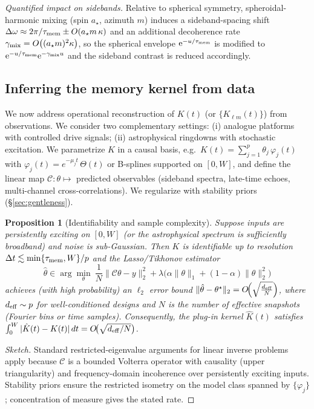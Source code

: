 \documentclass[aps,prd,preprint,onecolumn,superscriptaddress,nofootinbib,longbibliography,floatfix,11pt,showpacs,showkeys]{revtex4-2}
\theoremstyle{plain}
\newtheorem{proposition}[theorem]{Proposition}
\theoremstyle{definition}
\theoremstyle{remark}
\begin{document}
\noindent\emph{Quantified impact on sidebands.} Relative to spherical symmetry, spheroidal-harmonic mixing (spin $a_\star$, azimuth $m$) induces a sideband-spacing shift
\(\Delta\omega\approx 2\pi/\tau_{\rm mem} \pm O(a_\star m\,\kappa)\) and an additional decoherence rate
\(\gamma_{\rm mix}=O\big((a_\star m)^2\kappa\big)\), so the spherical envelope $\mathrm{e}^{-u/\tau_{\rm mem}}$ is modified to $\mathrm{e}^{-u/\tau_{\rm mem}}\mathrm{e}^{-\gamma_{\rm mix} u}$ and the sideband contrast is reduced accordingly.

\subsection{Inferring the memory kernel from data}
\label{sec:inference}
We now address operational reconstruction of $K(t)$ (or $\{K_{\ell m}(t)\}$) from observations. We consider two complementary
settings: (i) analogue platforms with controlled drive signals; (ii) astrophysical ringdowns with stochastic excitation.
We parametrize $K$ in a causal basis, e.g.\ $K(t)=\sum_{j=1}^{p}\theta_j\,\varphi_j(t)$ with $\varphi_j(t)=e^{-\mu_j t}\,\Theta(t)$
or B-splines supported on $[0,W]$, and define the linear map $\mathcal{C}:\theta\mapsto$ predicted observables (sideband spectra,
late-time echoes, multi-channel cross-correlations). We regularize with stability priors (\S\ref{sec:gentleness}).

\begin{proposition}[Identifiability and sample complexity]\label{prop:identifiability}
Suppose inputs are persistently exciting on $[0,W]$ (or the astrophysical spectrum is sufficiently broadband) and noise is sub-Gaussian.
Then $K$ is identifiable up to resolution $\Delta t\lesssim \min\{\tau_{\rm mem},W\}/p$ and the Lasso/Tikhonov estimator
\begin{equation}
\hat\theta \in \arg\min_{\theta}\ \frac{1}{N}\|\mathcal{C}\theta-y\|_2^2+\lambda\big(\alpha\|\theta\|_1+(1-\alpha)\|\theta\|_2^2\big)
\end{equation}
achieves (with high probability) an $\ell_2$ error bound $\|\hat\theta-\theta^\star\|_2 = O\!\Big(\sqrt{\tfrac{d_{\rm eff}}{N}}\Big)$,
where $d_{\rm eff}\sim p$ for well-conditioned designs and $N$ is the number of effective snapshots (Fourier bins or time samples).
Consequently, the plug-in kernel $\hat K(t)$ satisfies $\int_0^W|\hat K(t)-K(t)|\,dt=O\!\big(\sqrt{d_{\rm eff}/N}\big)$.
\end{proposition}
\begin{proof}[Sketch]
Standard restricted-eigenvalue arguments for linear inverse problems apply because $\mathcal{C}$ is a bounded Volterra operator with
causality (upper triangularity) and frequency-domain incoherence over persistently exciting inputs. Stability priors ensure the
restricted isometry on the model class spanned by $\{\varphi_j\}$; concentration of measure gives the stated rate.
\end{proof}
\end{document}

